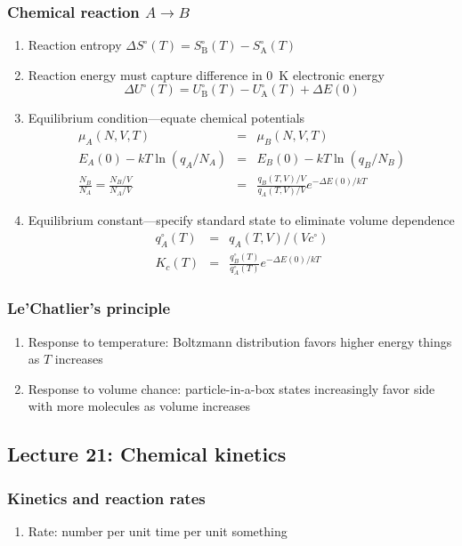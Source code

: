 \documentclass[11pt]{article}
\begin{document}
\subsubsection{Chemical reaction \(A \rightarrow B\)}
\label{sec:org565ea26}
\begin{enumerate}
\item Reaction entropy \(\Delta S^\circ (T) =  S^\circ_\mathrm{B}(T)-S^\circ_\mathrm{A}(T)\)
\item Reaction energy must capture difference in \SI{0}{K} electronic energy
  \begin{displaymath}
\Delta U^\circ (T) = U^\circ_\mathrm{B}(T)-U^\circ_\mathrm{A}(T)+\Delta E(0)
   \end{displaymath}
\item Equilibrium condition---equate chemical potentials
  \begin{eqnarray*}
 \mu_A(N,V,T) & = & \mu_B(N,V,T) \\
 E_A(0) - k T \ln (q_A/N_A) & = & E_B(0) - k T \ln (q_B/N_B) \\
\frac{N_B}{N_A} =  \frac{N_B/V}{N_A/V} & = &\frac{q_B(T,V)/V}{q_A(T,V)/V} e^{-\Delta E(0)/kT}
  \end{eqnarray*}
\item Equilibrium constant---specify standard state to eliminate volume dependence
 \begin{eqnarray*}
  q_A^\circ(T) & = & q_A(T,V)/(V c^\circ) \\
K_c(T) & = &\frac{q_B^\circ(T)}{q_A^\circ(T)} e^{-\Delta E(0)/kT}
 \end{eqnarray*}
\end{enumerate}
\subsubsection{Le'Chatlier's principle}
\label{sec:org0c34767}
\begin{enumerate}
\item Response to temperature: Boltzmann distribution favors higher energy things as \(T\) increases
\item Response to volume chance: particle-in-a-box states increasingly favor side with more molecules as volume increases
\end{enumerate}

\subsection{Lecture 21: Chemical kinetics}
\label{sec:org03d7167}
\subsubsection{Kinetics and reaction rates}
\label{sec:org00e493d}
\begin{enumerate}
\item Rate: number per unit time per unit something
\end{enumerate}
\end{document}
